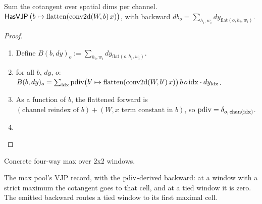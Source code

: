 \begin{theorem}
  \label{ax:conv2dBiasGradHasVJP}
  \leanok
  Sum the cotangent over spatial dims per channel.
  \Prove{} \(\mathsf{HasVJP}\, \bigl(b \mapsto \mathrm{flatten}
    (\mathrm{conv2d}(W, b)\, x)\bigr)\), with backward
  \(db_o = \sum_{h_i, w_i} dy_{\mathrm{flat}(o, h_i, w_i)}\).
\end{theorem}

\begin{proof}
\leanok
\begin{enumerate}
  \item Define \(B(b, dy)_o := \sum_{h_i, w_i}
    dy_{\mathrm{flat}(o, h_i, w_i)}\).
  \item \Suffices{} for all \(b\), \(dy\), \(o\):
    \(B(b, dy)_o = \sum_{\mathrm{idx}}
      \operatorname{pdiv}\bigl(b' \mapsto \mathrm{flatten}(\mathrm{conv2d}(W, b')\, x)\bigr)\,
      b\, o\, \mathrm{idx} \cdot dy_{\mathrm{idx}}\).
  \item As a function of \(b\), the flattened forward is
    \((\text{channel reindex of } b) + (\text{$W\!,x$ term constant
    in } b)\), so
    \(\operatorname{pdiv} = \delta_{o,\, \mathrm{chan}(\mathrm{idx})}\).
  \item \Qed{}
\end{enumerate}
\end{proof}

\begin{definition}
  \label{ax:maxPool2}
  \leanok
  Concrete four-way max over 2x2 windows.
\end{definition}

\begin{definition}
  \label{ax:maxPool2HasVJP3}
  \leanok
  The max pool's VJP record, with the \(\operatorname{pdiv}\)-derived backward: at a
  window with a strict maximum the cotangent goes to that cell, and at a
  tied window it is zero. The emitted backward routes a tied window to its
  first maximal cell.
\end{definition}

